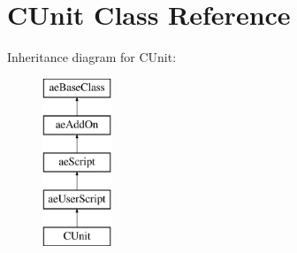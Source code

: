 \hypertarget{class_c_unit}{}\section{C\+Unit Class Reference}
\label{class_c_unit}
Inheritance diagram for C\+Unit\+:\begin{figure}[H]
\begin{center}
\leavevmode
\includegraphics[height=5.000000cm]{class_c_unit}
\end{center}
\end{figure}
